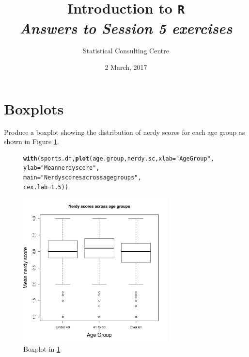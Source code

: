 \documentclass[12pt,a4paper]{article}\usepackage[]{graphicx}\usepackage[]{color}
\makeatletter
\newcommand{\hlnum}[1]{\textcolor[rgb]{0.686,0.059,0.569}{#1}}%
\newcommand{\hlstr}[1]{\textcolor[rgb]{0.192,0.494,0.8}{#1}}%
\newcommand{\hlstd}[1]{\textcolor[rgb]{0.345,0.345,0.345}{#1}}%
\newcommand{\hlkwc}[1]{\textcolor[rgb]{0.333,0.667,0.333}{#1}}%
\newcommand{\hlkwd}[1]{\textcolor[rgb]{0.737,0.353,0.396}{\textbf{#1}}}%
\newenvironment{kframe}{%
 \def\at@end@of@kframe{}%
 \ifinner\ifhmode%
  \def\at@end@of@kframe{\end{minipage}}%
  \begin{minipage}{\columnwidth}%
 \fi\fi%
 \def\FrameCommand##1{\hskip\@totalleftmargin \hskip-\fboxsep
 \colorbox{shadecolor}{##1}\hskip-\fboxsep
     \hskip-\linewidth \hskip-\@totalleftmargin \hskip\columnwidth}%
 \MakeFramed {\advance\hsize-\width
   \@totalleftmargin\z@ \linewidth\hsize
   \@setminipage}}%
 {\par\unskip\endMakeFramed%
 \at@end@of@kframe}
\newenvironment{knitrout}{}{} %
\makeatother
\begin{document}
\setlength\parindent{0cm}
\title{\Large{\textbf{Introduction to \texttt{R}}}\\
\textit{Answers to Session 5 exercises}}
\author{Statistical Consulting Centre}
\date{2 March, 2017}
\maketitle
 

\section{Boxplots}
\label{sec:box}
Produce a boxplot showing the distribution of nerdy scores for each age group as shown in Figure \ref{fig:box1}.
\begin{figure}[h]   
 \centering
\begin{knitrout}
\color{fgcolor}\begin{kframe}
\begin{alltt}
\hlkwd{with}\hlstd{(sports.df,} \hlkwd{plot}\hlstd{(age.group, nerdy.sc,} \hlkwc{xlab} \hlstd{=} \hlstr{"Age Group"}\hlstd{,}
                     \hlkwc{ylab} \hlstd{=} \hlstr{"Mean nerdy score"}\hlstd{,}
                     \hlkwc{main} \hlstd{=} \hlstr{"Nerdy scores across age groups"}\hlstd{,}
                     \hlkwc{cex.lab} \hlstd{=} \hlnum{1.5}\hlstd{))}
\end{alltt}
\end{kframe}
\includegraphics[width=0.7\textwidth]{figure/box1-1} 

\end{knitrout}
\caption{Boxplot in \ref{sec:box}}
  \label{fig:box1}
\end{figure}\\
\end{document}
